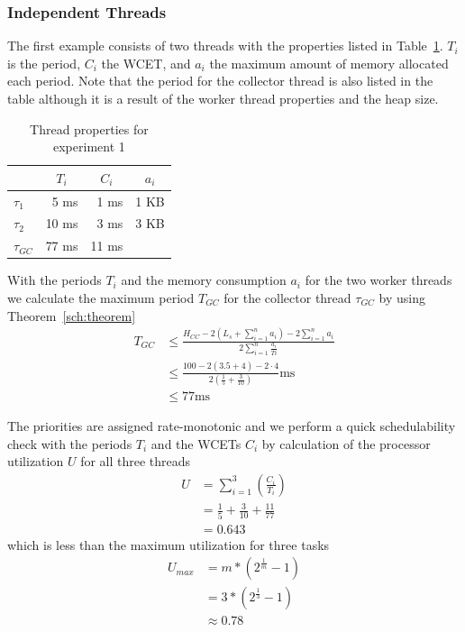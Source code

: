 \subsubsection{Independent Threads}

The first example consists of two threads with the properties listed
in Table~\ref{fig:ex1}. $T_i$ is the period, $C_i$ the WCET, and
$a_i$ the maximum amount of memory allocated each period. Note that
the period for the collector thread is also listed in the table
although it is a result of the worker thread properties and the heap
size.

\begin{table}[tb]
\begin{center}
\begin{tabular}{lrrr}
    \toprule
    & \multicolumn{1}{c}{$T_i$} & \multicolumn{1}{c}{$C_i$} & \multicolumn{1}{c}{$a_i$} \\
    \midrule
    $\tau_1$ & 5 ms & 1 ms & 1 KB \\
    $\tau_2$ & 10 ms & 3 ms & 3 KB \\
    $\tau_{GC}$ & 77 ms & 11 ms & \\
    \bottomrule
\end{tabular}
    \caption{Thread properties for experiment 1}
\label{fig:ex1}
\end{center}
\end{table}

With the periods $T_i$ and the memory consumption $a_i$ for the two
worker threads we calculate the maximum period $T_{GC}$ for the
collector thread $\tau_{GC}$ by using Theorem~\ref{sch:theorem}
\begin{align*}
    T_{GC} & \le \frac{H_{CC}-2\left(L_s+\sum_{i=1}^{n} a_i\right)-2\sum_{i=1}^{n} a_i}
        {2\sum_{i=1}^{n} \frac{a_i}{Ti}} \\
           & \le \frac{100-2(3.5+4)-2\cdot4}
           {2\left(\frac{1}{5}+\frac{3}{10}\right)}\mbox{ms}\\
           & \le 77\mbox{ms}
\end{align*}

The priorities are assigned rate-monotonic \cite{321743} and we
perform a quick schedulability check with the periods $T_i$ and the
WCETs $C_i$ by calculation of the processor utilization $U$ for all
three threads
\begin{align*}
    U & = \sum_{i=1}^{3}\left(\frac{C_i}{T_i}\right)\\
      & = \frac{1}{5} + \frac{3}{10} + \frac{11}{77}\\
      & = 0.643
\end{align*}
which is less than the maximum utilization for three tasks
\begin{align*}
    U_{max} & = m*(2^{\frac{1}{m}}-1)\\
      & = 3*(2^{\frac{1}{3}}-1)\\
      & \approx 0.78
\end{align*}

